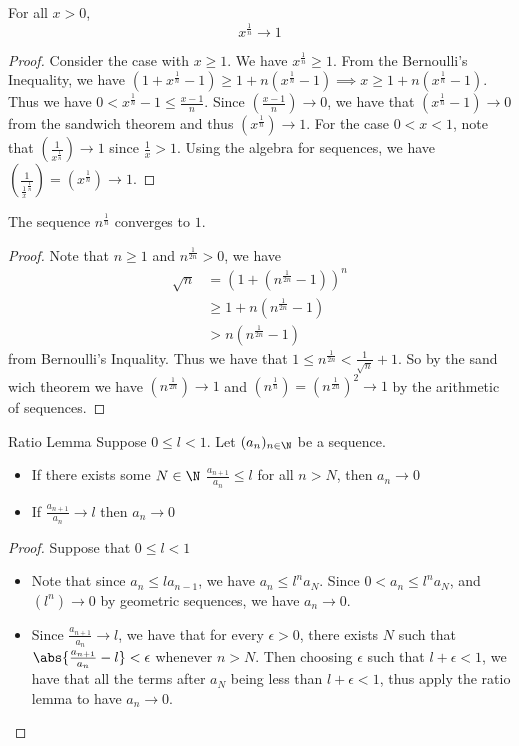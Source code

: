 \begin{thm}{}{} For all $x>0$, $$x^{\frac{1}{n}}\to 1$$ \tcbline
\begin{proof} Consider the case with $x\geq1$. We have $x^\frac{1}{n}\geq1$. From the Bernoulli's Inequality, we have $\left(1+x^\frac{1}{n}-1\right)\geq1+n\left(x^\frac{1}{n}-1\right)\implies x\geq1+n\left(x^\frac{1}{n}-1\right)$.  Thus we have $0<x^\frac{1}{n}-1\leq\frac{x-1}{n}$. Since $\left(\frac{x-1}{n}\right)\to0$, we have that $\left(x^\frac{1}{n}-1\right)\to0$ from the sandwich theorem and thus $\left(x^\frac{1}{n}\right)\to1$. For the case $0<x<1$, note that $\left(\frac{1}{x^\frac{1}{n}}\right)\to1$ since $\frac{1}{x}>1$. Using the algebra for sequences, we have $\left(\frac{1}{\frac{1}{x}^{\frac{1}{n}}}\right)=\left(x^\frac{1}{n}\right)\to1$. 
\end{proof}
\end{thm}

\begin{thm}{}{} The sequence $n^{\frac{1}{n}}$ converges to $1$. \tcbline
\begin{proof} Note that $n\geq1$ and $n^\frac{1}{2n}>0$, we have 
\begin{align*}
\sqrt{n}&=(1+(n^\frac{1}{2n}-1))^n \\
&\geq1+n(n^\frac{1}{2n}-1) \\
&>n(n^\frac{1}{2n}-1)
\end{align*}
from Bernoulli's Inquality. Thus we have that $1\leq n^\frac{1}{2n}<\frac{1}{\sqrt{n}}+1$. So by the sand wich theorem we have $(n^\frac{1}{2n})\to1$ and $(n^\frac{1}{n})=(n^\frac{1}{2n})^2\to1$ by the arithmetic of sequences. 
\end{proof}
\end{thm}

\begin{thm}{Ratio Lemma}{} Suppose $0\leq l<1$. Let $(a_n)_{n\in\N}$ be a sequence. 
\begin{itemize}
\item If there exists some $N\in\N$ $\frac{a_{n+1}}{a_n}\leq l$ for all $n>N$, then $a_n\to 0$
\item If $\frac{a_{n+1}}{a_n}\to l$ then $a_n\to0$
\end{itemize}\tcbline
\begin{proof} Suppose that $0\leq l<1$
\begin{itemize}
\item Note that since $a_n\leq la_{n-1}$, we have $a_n\leq l^na_N$. Since $0<a_n\leq l^na_N$, and $(l^n)\to 0$ by geometric sequences, we have $a_n\to 0$. 
\item Since $\frac{a_{n+1}}{a_n}\to l$, we have that for every $\epsilon>0$, there exists $N$ such that $\abs{\frac{a_{n+1}}{a_n}-l}<\epsilon$ whenever $n>N$. Then choosing $\epsilon$ such that $l+\epsilon<1$, we have that all the terms after $a_N$ being less than $l+\epsilon<1$, thus apply the ratio lemma to have $a_n\to 0$. 
\end{itemize}
\end{proof}
\end{thm}

